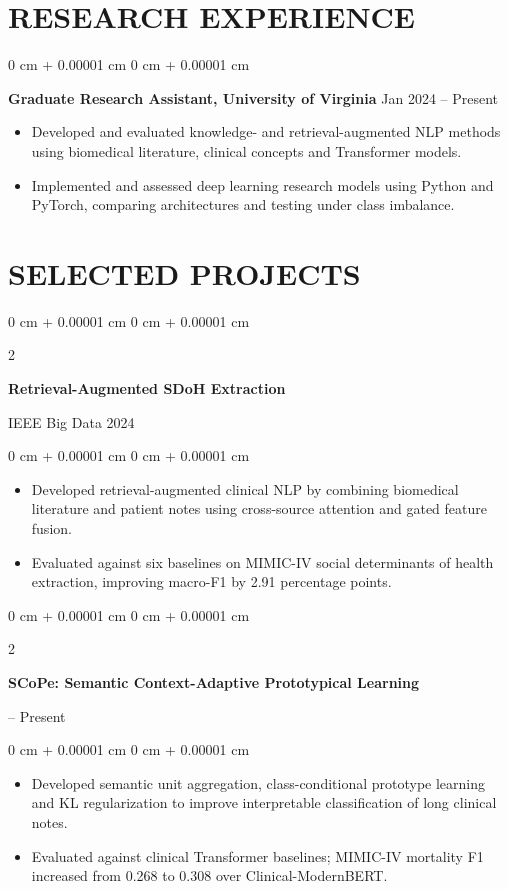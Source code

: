 \documentclass[10pt, letterpaper]{article}
\newenvironment{highlights}{
    \begin{itemize}[
        topsep=0.03 cm,
        parsep=0.03 cm,
        partopsep=0pt,
        itemsep=0pt,
        leftmargin=0 cm + 10pt
    ]
}{
    \end{itemize}
} %
\newenvironment{onecolentry}{
    \begin{adjustwidth}{
        0 cm + 0.00001 cm
    }{
        0 cm + 0.00001 cm
    }
}{
    \end{adjustwidth}
} %
\newenvironment{twocolentry}[2][]{
    \onecolentry
    \def\secondColumn{#2}
    \setcolumnwidth{\fill, 4.5 cm}
    \begin{paracol}{2}
}{
    \switchcolumn \raggedleft \secondColumn
    \end{paracol}
    \endonecolentry
} %
\begin{document}
\section{RESEARCH EXPERIENCE}
\begin{onecolentry}
\textbf{Graduate Research Assistant, University of Virginia} \hfill Jan 2024 -- Present
\begin{highlights}
\item Developed and evaluated knowledge- and retrieval-augmented NLP methods using biomedical literature, clinical concepts and Transformer models.
\item Implemented and assessed deep learning research models using Python and PyTorch, comparing architectures and testing under class imbalance.
\end{highlights}
\end{onecolentry}
\section{SELECTED PROJECTS}
\begin{twocolentry}{IEEE Big Data 2024}
\textbf{Retrieval-Augmented SDoH Extraction}
\end{twocolentry}
\begin{onecolentry}
\begin{highlights}
\item Developed retrieval-augmented clinical NLP by combining biomedical literature and patient notes using cross-source attention and gated feature fusion.
\item Evaluated against six baselines on MIMIC-IV social determinants of health extraction, improving macro-F1 by 2.91 percentage points.
\end{highlights}
\end{onecolentry}
\vspace{0.035 cm}

\begin{twocolentry}{2026 -- Present}
\textbf{SCoPe: Semantic Context-Adaptive Prototypical Learning}
\end{twocolentry}
\begin{onecolentry}
\begin{highlights}
\item Developed semantic unit aggregation, class-conditional prototype learning and KL regularization to improve interpretable classification of long clinical notes.
\item Evaluated against clinical Transformer baselines; MIMIC-IV mortality F1 increased from 0.268 to 0.308 over Clinical-ModernBERT.
\end{highlights}
\end{onecolentry}
\vspace{0.035 cm}
\end{document}
